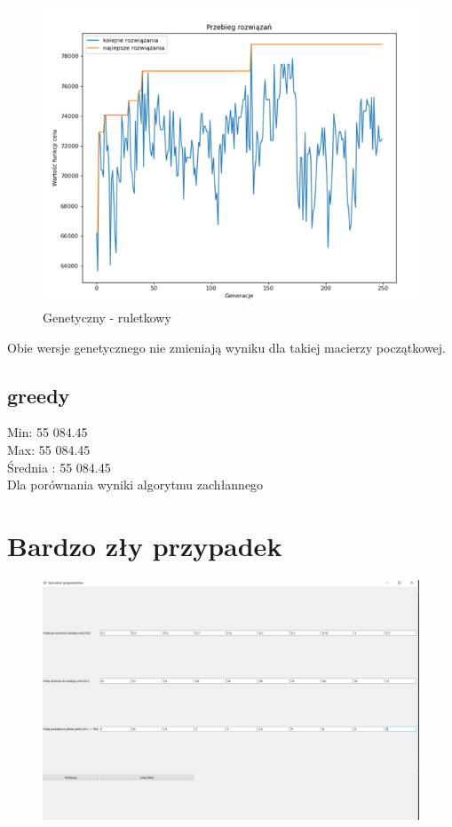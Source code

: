 \documentclass{article}
\begin{document}
\begin{figure}[H]
	\centering
	\includegraphics[width=0.7\linewidth]{screens/genetic_roulet_zlych_przypadkow}
	\caption{Genetyczny - ruletkowy}
	\label{fig:geneticrouletzlychprzypadkow}
\end{figure}

Obie wersje genetycznego nie zmieniają wyniku dla takiej macierzy początkowej.


\subsection{greedy}

Min: 55 084.45\\
Max: 55 084.45\\
Średnia : 55 084.45\\

Dla porównania wyniki algorytmu zachłannego

\section{Bardzo zły przypadek}

\begin{figure}[H]
	\centering
	\includegraphics[width=0.7\linewidth]{screens/bad_very_bad_matrix}
	\caption{}
	\label{fig:badverybadmatrix}
\end{figure}
\end{document}
